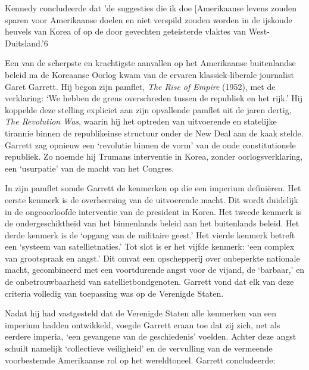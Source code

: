 \documentclass[
  a5paper,
  smalldemyvopaper,10pt,twoside,onecolumn,openright,extrafontsizes,hidelinks]{memoir}
\begin{document}
Kennedy concludeerde dat 'de suggesties die ik doe {[}Amerikaanse levens
zouden sparen voor Amerikaanse doelen en niet verspild zouden worden in
de ijskoude heuvels van Korea of op de door gevechten geteisterde
vlaktes van West-Duitsland.'6

Een van de scherpste en krachtigste aanvallen op het Amerikaanse
buitenlandse beleid na de Koreaanse Oorlog kwam van de ervaren
klassiek-liberale journalist Garet Garrett. Hij begon zijn pamflet,
\emph{The Rise of Empire} (1952), met de verklaring: `We hebben de grens
overschreden tussen de republiek en het rijk.' Hij koppelde deze
stelling expliciet aan zijn opvallende pamflet uit de jaren dertig,
\emph{The Revolution Was}, waarin hij het optreden van uitvoerende en
statelijke tirannie binnen de republikeinse structuur onder de New Deal
aan de kaak stelde. Garrett zag opnieuw een `revolutie binnen de vorm'
van de oude constitutionele republiek. Zo noemde hij Trumans interventie
in Korea, zonder oorlogsverklaring, een `usurpatie' van de macht van het
Congres.

In zijn pamflet somde Garrett de kenmerken op die een imperium
definiëren. Het eerste kenmerk is de overheersing van de uitvoerende
macht. Dit wordt duidelijk in de ongeoorloofde interventie van de
president in Korea. Het tweede kenmerk is de ondergeschiktheid van het
binnenlands beleid aan het buitenlands beleid. Het derde kenmerk is de
`opgang van de militaire geest.' Het vierde kenmerk betreft een `systeem
van satellietnaties.' Tot slot is er het vijfde kenmerk: `een complex
van grootspraak en angst.' Dit omvat een opschepperij over onbeperkte
nationale macht, gecombineerd met een voortdurende angst voor de vijand,
de `barbaar,' en de onbetrouwbaarheid van satellietbondgenoten. Garrett
vond dat elk van deze criteria volledig van toepassing was op de
Verenigde Staten.

Nadat hij had vastgesteld dat de Verenigde Staten alle kenmerken van een
imperium hadden ontwikkeld, voegde Garrett eraan toe dat zij zich, net
als eerdere imperia, `een gevangene van de geschiedenis' voelden. Achter
deze angst schuilt namelijk `collectieve veiligheid' en de vervulling
van de vermeende voorbestemde Amerikaanse rol op het wereldtoneel.
Garrett concludeerde:
\end{document}
